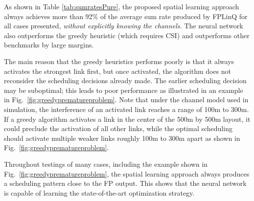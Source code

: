 \documentclass[journal,12pt,onecolumn,draftclsnofoot,]{IEEEtran}
\begin{document}
As shown in Table \ref{tab:sumratesPure}, the proposed
spatial learning approach always achieves more than 92\% of the average sum rate
produced by FPLinQ for all cases presented, \emph{without explicitly knowing the channels.} 
The neural network also outperforms the greedy heuristic (which requires CSI) and outperforms other benchmarks by large margins. 

The main reason that the greedy heuristics performs poorly is that it always
activates the strongest link first, but once activated, the algorithm does not
reconsider the scheduling decisions already made. The earlier scheduling
decision may be suboptimal; this leads to poor performance as illustrated in
an example in Fig.~\ref{fig:greedyprematureproblem}. Note that under the
channel model used in simulation, the interference of an activated link reaches
a range of 100m to 300m. If a greedy algorithm activates a link in the center
of the 500m by 500m layout, it could preclude the activation of all other
links, while the optimal scheduling should activate multiple weaker links
roughly 100m to 300m apart as shown in Fig.~\ref{fig:greedyprematureproblem}. 

Throughout testings of many cases, including the example shown in
Fig.~\ref{fig:greedyprematureproblem}, the spatial learning approach always
produces a scheduling pattern close to the FP output. This shows that the
neural network is capable of learning the state-of-the-art optimization strategy.
\end{document}
